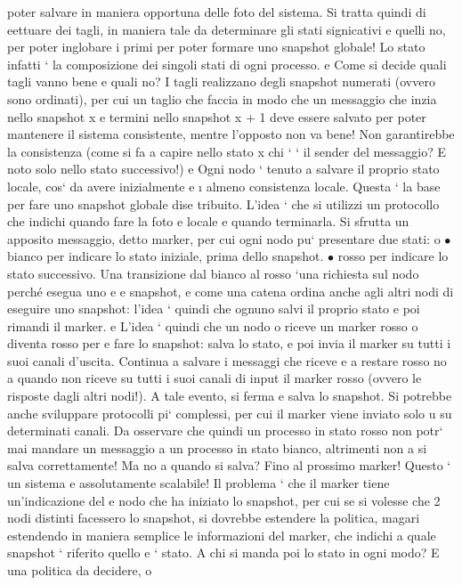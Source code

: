 \documentclass[a4paper,12pt]{article}
\begin{document}
poter salvare in maniera opportuna delle foto del sistema. Si tratta quindi di
eettuare dei tagli, in maniera tale da determinare gli stati signicativi e quelli
no, per poter inglobare i primi per poter formare uno snapshot globale! Lo stato
infatti ` la composizione dei singoli stati di ogni processo.
e
Come si decide quali tagli vanno bene e quali no? I tagli realizzano degli
snapshot numerati (ovvero sono ordinati), per cui un taglio che faccia in modo
che un messaggio che inzia nello snapshot x e termini nello snapshot x + 1 deve
essere salvato per poter mantenere il sistema consistente, mentre l'opposto non
va bene! Non garantirebbe la consistenza (come si fa a capire nello stato x chi
`
` il sender del messaggio? E noto solo nello stato successivo!)
e
Ogni nodo ` tenuto a salvare il proprio stato locale, cos` da avere inizialmente
e
\i{}
almeno consistenza locale. Questa ` la base per fare uno snapshot globale dise
tribuito. L'idea ` che si utilizzi un protocollo che indichi quando fare la foto
e
locale e quando terminarla. Si sfrutta un apposito messaggio, detto marker, per
cui ogni nodo pu` presentare due stati:
o
$\bullet$ bianco per indicare lo stato iniziale, prima dello snapshot.
$\bullet$ rosso per indicare lo stato successivo.
Una transizione dal bianco al rosso `una richiesta sul nodo perché esegua uno
e
e
snapshot, e come una catena ordina anche agli altri nodi di eseguire uno snapshot: l'idea ` quindi che ognuno salvi il
proprio stato e poi rimandi il marker.
e
L'idea ` quindi che un nodo o riceve un marker rosso o diventa rosso per
e
fare lo snapshot: salva lo stato, e poi invia il marker su tutti i suoi canali
d'uscita. Continua a salvare i messaggi che riceve e a restare rosso no a quando
non riceve su tutti i suoi canali di input il marker rosso (ovvero le risposte
dagli altri nodi!). A tale evento, si ferma e salva lo snapshot. Si potrebbe
anche sviluppare protocolli pi` complessi, per cui il marker viene inviato solo
u
su determinati canali. Da osservare che quindi un processo in stato rosso non
potr` mai mandare un messaggio a un processo in stato bianco, altrimenti non
a
si salva correttamente!
Ma no a quando si salva? Fino al prossimo marker! Questo ` un sistema
e
assolutamente scalabile! Il problema ` che il marker tiene un'indicazione del
e
nodo che ha iniziato lo snapshot, per cui se si volesse che 2 nodi distinti facessero
lo snapshot, si dovrebbe estendere la politica, magari estendendo in maniera
semplice le informazioni del marker, che indichi a quale snapshot ` riferito quello
e
`
stato. A chi si manda poi lo stato in ogni modo? E una politica da decidere, o
\end{document}
